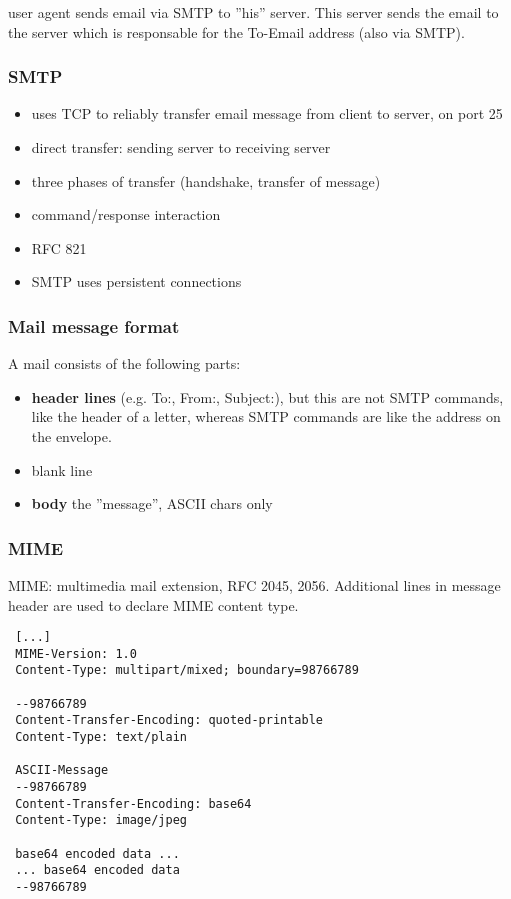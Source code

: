 \documentclass[10pt, a4paper, twocolumn]{scrartcl}
\begin{document}
user agent sends email via SMTP to ''his'' server. This server sends the email to the server which is responsable for the To-Email address (also via SMTP).

\subsubsection{SMTP}

\begin{itemize}
	\item uses TCP to reliably transfer email message from client to server, on port 25
	\item direct transfer: sending server to receiving server
	\item three phases of transfer (handshake, transfer of message)
	\item command/response interaction
	\item RFC 821
	\item SMTP uses persistent connections
\end{itemize}

\subsubsection{Mail message format}

A mail consists of the following parts:

\begin{itemize}
	\item \textbf{header lines} (e.g. To:, From:, Subject:), but this are not SMTP commands, like the header of a letter, whereas SMTP commands are like the address on the envelope.
	\item blank line
	\item \textbf{body} the ''message'', ASCII chars only
\end{itemize}

\subsubsection{MIME}

MIME: multimedia mail extension, RFC 2045, 2056. Additional lines in message header are used to declare MIME content type.

\begin{verbatim}
 [...]
 MIME-Version: 1.0
 Content-Type: multipart/mixed; boundary=98766789

 --98766789
 Content-Transfer-Encoding: quoted-printable
 Content-Type: text/plain

 ASCII-Message
 --98766789
 Content-Transfer-Encoding: base64
 Content-Type: image/jpeg

 base64 encoded data ...
 ... base64 encoded data
 --98766789
\end{verbatim}
\end{document}
